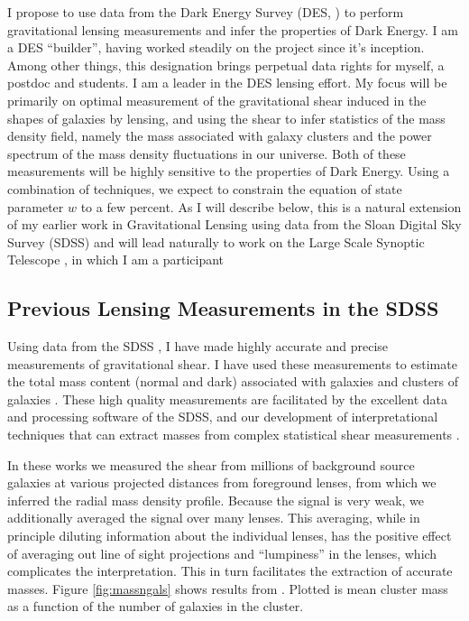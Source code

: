 \documentclass[12pt]{article}
\begin{document}
I propose to use data from the Dark Energy Survey (DES, \cite{DESWhitePaper})
to perform gravitational lensing measurements and infer the properties of Dark
Energy.  I am a DES ``builder'', having worked steadily on the project since
it's inception.  Among other things, this designation brings perpetual data
rights for myself, a postdoc and students.  I am a leader in the DES lensing
effort.  My focus will be primarily on optimal measurement of the gravitational
shear induced in the shapes of galaxies by lensing, and using the shear to
infer statistics of the mass density field, namely the mass associated with
galaxy clusters and the power spectrum of the mass density fluctuations in our
universe. Both of these measurements will be highly sensitive to the properties
of Dark Energy.  Using a combination of techniques, we expect to constrain the
equation of state parameter $w$ to a few percent.  As I will describe below,
this is a natural extension of my earlier work in Gravitational Lensing using
data from the Sloan Digital Sky Survey (SDSS) and will lead naturally to work
on the Large Scale Synoptic Telescope \cite{lsstweb}, in which I am a
participant 

\subsection{Previous Lensing Measurements in the SDSS} \label{sec:sdssold}

Using data from the SDSS \cite{York00}, I have made highly accurate and precise
measurements of gravitational shear. I have used these measurements to estimate
the total mass content (normal and dark) associated with galaxies and clusters
of galaxies
\cite{fis00,Sheldon04,SheldonLensing07,JohnstonLensing07,SheldonM2L07}.  These
high quality measurements are facilitated by the excellent data and processing
software of the SDSS, and our development of interpretational techniques that
can extract masses from complex statistical shear measurements
\cite{JohnstonInvert07}.

In these works we measured the shear from millions of background source
galaxies at various projected distances from foreground lenses, from which we
inferred the radial mass density profile.  Because the signal is very weak, we
additionally averaged the signal over many lenses.  This averaging, while in
principle diluting information about the individual lenses, has the positive
effect of averaging out line of sight projections and ``lumpiness'' in the
lenses, which complicates the interpretation.  This in turn facilitates the
extraction of accurate masses.  Figure \ref{fig:massngals} shows results
from \cite{SheldonLensing07,JohnstonLensing07}. Plotted is mean cluster mass as
a function of the number of galaxies in the cluster.  
\end{document}
